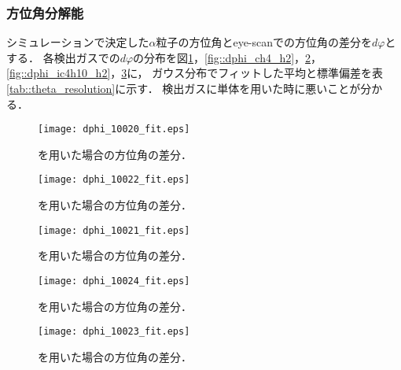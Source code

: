 \documentclass[../master]{subfiles}
\begin{document}
\subsubsection{方位角分解能}
シミュレーションで決定した$\alpha$粒子の方位角とeye-scanでの方位角の差分を$d\varphi$とする．
各検出ガスでの$d\varphi$の分布を図\ref{fig::dphi_ch4}，\ref{fig::dphi_ch4_h2}，\ref{fig::dphi_ch4_he}，
\ref{fig::dphi_ic4h10_h2}，\ref{fig::dphi_ic4h10_he}に，
ガウス分布でフィットした平均と標準偏差を表\ref{tab::theta_resolution}に示す．
検出ガスに\Methane 単体を用いた時に悪いことが分かる．
\begin{figure}
  \centering
  \begin{minipage}{0.45\columnwidth}
    \centering
    \texttt{[image: dphi\_10020\_fit.eps]}
    \caption{\Methane を用いた場合の方位角の差分．}
    \label{fig::dphi_ch4}
  \end{minipage}
\end{figure}
\begin{figure}
  \centering
  \begin{minipage}{0.45\columnwidth}
    \centering
    \texttt{[image: dphi\_10022\_fit.eps]}
    \caption{\MethaneHydro を用いた場合の方位角の差分．}
    \label{fig::dphi_ch4_h2}
  \end{minipage}
  \begin{minipage}{0.45\columnwidth}
    \centering
    \texttt{[image: dphi\_10021\_fit.eps]}
    \caption{\MethaneHerium を用いた場合の方位角の差分．}
    \label{fig::dphi_ch4_he}
  \end{minipage}
\end{figure}
\begin{figure}
  \centering
  \begin{minipage}{0.45\columnwidth}
    \centering
    \texttt{[image: dphi\_10024\_fit.eps]}
    \caption{\isoButaneHydro を用いた場合の方位角の差分．}
    \label{fig::dphi_ic4h10_h2}
  \end{minipage}
  \begin{minipage}{0.45\columnwidth}
    \centering
    \texttt{[image: dphi\_10023\_fit.eps]}
    \caption{\isoButaneHerium を用いた場合の方位角の差分．}
    \label{fig::dphi_ic4h10_he}
  \end{minipage}
\end{figure}
\end{document}
